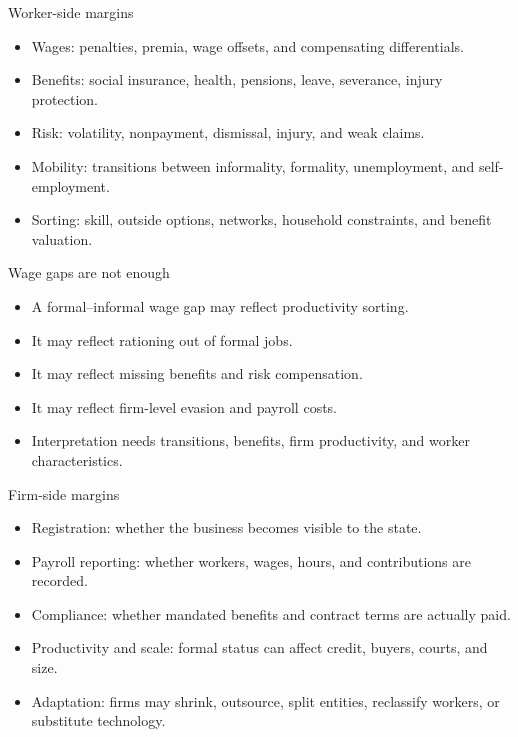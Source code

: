 \documentclass[aspectratio=169,11pt]{beamer}
\begin{document}
\begin{frame}{Worker-side margins}
\begin{itemize}
    \item Wages: penalties, premia, wage offsets, and compensating differentials.
    \item Benefits: social insurance, health, pensions, leave, severance, injury protection.
    \item Risk: volatility, nonpayment, dismissal, injury, and weak claims.
    \item Mobility: transitions between informality, formality, unemployment, and self-employment.
    \item Sorting: skill, outside options, networks, household constraints, and benefit valuation.
\end{itemize}
\end{frame}

\begin{frame}{Wage gaps are not enough}
\begin{itemize}
    \item A formal--informal wage gap may reflect productivity sorting.
    \item It may reflect rationing out of formal jobs.
    \item It may reflect missing benefits and risk compensation.
    \item It may reflect firm-level evasion and payroll costs.
    \item Interpretation needs transitions, benefits, firm productivity, and worker characteristics.
\end{itemize}
\end{frame}

\begin{frame}{Firm-side margins}
\begin{itemize}
    \item Registration: whether the business becomes visible to the state.
    \item Payroll reporting: whether workers, wages, hours, and contributions are recorded.
    \item Compliance: whether mandated benefits and contract terms are actually paid.
    \item Productivity and scale: formal status can affect credit, buyers, courts, and size.
    \item Adaptation: firms may shrink, outsource, split entities, reclassify workers, or substitute technology.
\end{itemize}
\end{frame}
\end{document}
